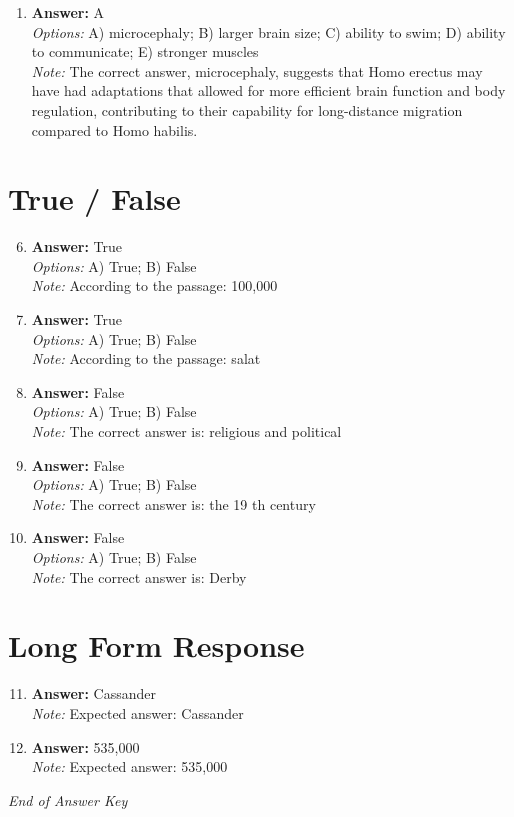 \documentclass[12pt]{article}
\begin{document}
\begin{enumerate}[label=\arabic*.]
\\ \textit{Note:} Anthropologists do not need to know when sled dogs were first domesticated because this information is unrelated to the timing of human migration from Siberia to the Americas, which is determined through archaeological, genetic, and environmental evidence.
\item \textbf{Answer:} A
\\ \textit{Options:} A) microcephaly; B) larger brain size; C) ability to swim; D) ability to communicate; E) stronger muscles
\\ \textit{Note:} The correct answer, microcephaly, suggests that Homo erectus may have had adaptations that allowed for more efficient brain function and body regulation, contributing to their capability for long-distance migration compared to Homo habilis.
\end{enumerate}

\section*{True / False}
\begin{enumerate}[label=\arabic*.]
\setcounter{enumi}{5}
\item \textbf{Answer:} True
\\ \textit{Options:} A) True; B) False
\\ \textit{Note:} According to the passage: 100,000
\item \textbf{Answer:} True
\\ \textit{Options:} A) True; B) False
\\ \textit{Note:} According to the passage: salat
\item \textbf{Answer:} False
\\ \textit{Options:} A) True; B) False
\\ \textit{Note:} The correct answer is: religious and political
\item \textbf{Answer:} False
\\ \textit{Options:} A) True; B) False
\\ \textit{Note:} The correct answer is: the 19 th century
\item \textbf{Answer:} False
\\ \textit{Options:} A) True; B) False
\\ \textit{Note:} The correct answer is: Derby
\end{enumerate}

\section*{Long Form Response}
\begin{enumerate}[label=\arabic*.]
\setcounter{enumi}{10}
\item \textbf{Answer:} Cassander
\\ \textit{Note:} Expected answer: Cassander
\item \textbf{Answer:} 535,000
\\ \textit{Note:} Expected answer: 535,000
\end{enumerate}

\vfill
\noindent\textit{End of Answer Key}
\end{document}

